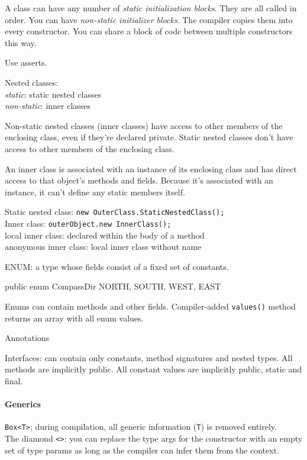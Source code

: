 A class can have any number of \emph{static initialization blocks}.
They are all called in order.
You can have \emph{non-static initializer blocks}.
The compiler copies them into every constructor.
You can share a block of code between multiple constructors this way.

Use asserts.

Nested classes:\\
\emph{static}: static nested classes\\
\emph{non-static}: inner classes

Non-static nested classes (inner classes) have access to other members
of the enclosing class, even if they're declared private.
Static nested classes don't have access to other members
of the enclosing class.

An inner class is associated with an instance of its enclosing class
and has direct access to that object's methods and fields.
Because it's associated with an instance,
it can't define any static members itself.

Static nested class: \verb=new OuterClass.StaticNestedClass();=\\
Inner class: \verb=outerObject.new InnerClass();=\\
local inner class: declared within the body of a method\\
anonymous inner class: local inner class without name

ENUM: a type whose fields consist of a fixed set of constants.
\begin{verbatimtab}
public enum CompassDir {
	NORTH, SOUTH, WEST, EAST
}
\end{verbatimtab}
Enums can contain methods and other fields.
Compiler-added \verb=values()= method returns an array with all enum values.

Annotations

Interfaces: can contain only constants, method signatures and nested types.
All methods are implicitly public.
All constant values are implicitly public, static and final.

\paragraph{Generics}
\verb=Box<T>=;
during compilation, all generic information (\verb=T=) is removed entirely.\\
The diamond \verb=<>=: you can replace the type args for the constructor
with an empty set of type params as long as the compiler can infer them
from the context.

